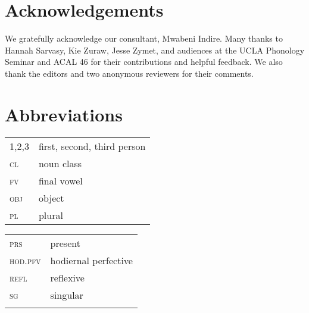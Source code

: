 \documentclass[output=paper]{langsci/langscibook}
\begin{document}
\section{Acknowledgements} We gratefully acknowledge our consultant, Mwabeni Indire. Many thanks to Hannah Sarvasy, Kie Zuraw, Jesse Zymet, and audiences at the UCLA Phonology Seminar and ACAL 46 for their contributions and helpful feedback. We also thank the editors and two anonymous reviewers for their comments.

\section*{Abbreviations}
\begin{tabularx}{.45\textwidth}{>{\scshape}lX}
1,2,3 &   first, second, third person\\
cl &   noun class\\
fv  &  final vowel\\
obj  &   object\\
pl  &    plural\\
\end{tabularx}
\begin{tabularx}{.45\textwidth}{>{\scshape}lX}
prs  &    present\\
hod.pfv  &  hodiernal perfective\\
refl  &    reflexive\\
sg  &    singular\\
\\
\end{tabularx}
 
 

\printbibliography[heading=subbibliography,notkeyword=this]
\end{document}
